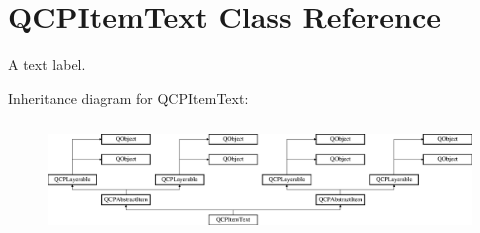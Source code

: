 \hypertarget{class_q_c_p_item_text}{}\section{Q\+C\+P\+Item\+Text Class Reference}
\label{class_q_c_p_item_text}


A text label.  


Inheritance diagram for Q\+C\+P\+Item\+Text\+:\begin{figure}[H]
\begin{center}
\leavevmode
\includegraphics[height=3.017241cm]{class_q_c_p_item_text}
\end{center}
\end{figure}
